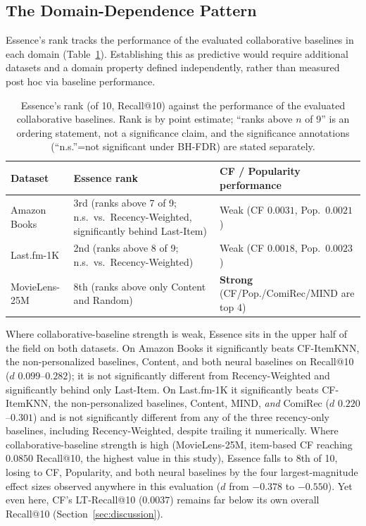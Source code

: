 \documentclass{article}
\begin{document}
\subsection{The Domain-Dependence Pattern}
\label{sec:domain-dependence}

Essence's rank tracks the performance of the evaluated collaborative baselines in each domain (Table~\ref{tab:domain-dependence}). Establishing this as predictive would require additional datasets and a domain property defined independently, rather than measured post hoc via baseline performance.

\begin{table}[t]
\centering
\caption{Essence's rank (of 10, Recall@10) against the performance of the evaluated collaborative baselines. Rank is by point estimate; ``ranks above $n$ of 9'' is an ordering statement, not a significance claim, and the significance annotations (``n.s.''=not significant under BH-FDR) are stated separately.}
\label{tab:domain-dependence}
\small
\begin{tabular}{@{}lp{5.0cm}p{4.2cm}@{}}
\toprule
\textbf{Dataset} & \textbf{Essence rank} & \textbf{CF / Popularity performance} \\
\midrule
Amazon Books & 3rd (ranks above 7 of 9; n.s.\ vs.\ Recency-Weighted, significantly behind Last-Item) & Weak (CF $0.0031$, Pop.\ $0.0021$) \\
Last.fm-1K & 2nd (ranks above 8 of 9; n.s.\ vs.\ Recency-Weighted) & Weak (CF $0.0018$, Pop.\ $0.0023$) \\
MovieLens-25M & 8th (ranks above only Content and Random) & \textbf{Strong} (CF/Pop./ComiRec/MIND are top 4) \\
\bottomrule
\end{tabular}
\end{table}

Where collaborative-baseline strength is weak, Essence sits in the upper half of the field on both datasets. On Amazon Books it significantly beats CF-ItemKNN, the non-personalized baselines, Content, and both neural baselines on Recall@10 ($d$ $0.099$--$0.282$); it is not significantly different from Recency-Weighted and significantly behind only Last-Item. On Last.fm-1K it significantly beats CF-ItemKNN, the non-personalized baselines, Content, MIND, \emph{and} ComiRec ($d$ $0.220$--$0.301$) and is not significantly different from any of the three recency-only baselines, including Recency-Weighted, despite trailing it numerically. Where collaborative-baseline strength is high (MovieLens-25M, item-based CF reaching $0.0850$ Recall@10, the highest value in this study), Essence falls to 8th of 10, losing to CF, Popularity, and both neural baselines by the four largest-magnitude effect sizes observed anywhere in this evaluation ($d$ from $-0.378$ to $-0.550$). Yet even here, CF's LT-Recall@10 ($0.0037$) remains far below its own overall Recall@10 (Section~\ref{sec:discussion}).
\end{document}
